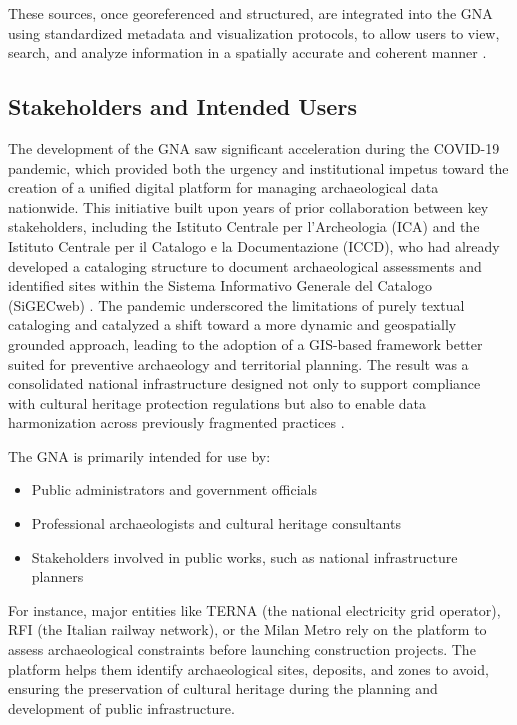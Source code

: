 \begin{spacing}{1.5}
\noindent These sources, once georeferenced and structured, are integrated into the GNA using standardized metadata and visualization protocols, to allow users to view, search, and analyze information in a spatially accurate and coherent manner \citep{boi_il_2023, acconcia_pubblicazione_2023}.

\subsection{Stakeholders and Intended Users}
The development of the GNA saw significant acceleration during the COVID-19 pandemic, which provided both the urgency and institutional impetus toward the creation of a unified digital platform for managing archaeological data nationwide. This initiative built upon years of prior collaboration between key stakeholders, including the Istituto Centrale per l’Archeologia (ICA) and the Istituto Centrale per il Catalogo e la Documentazione (ICCD), who had already developed a cataloging structure to document archaeological assessments and identified sites within the Sistema Informativo Generale del Catalogo (SiGECweb) \citep{calandra_il_2023, boi_il_2023}. The pandemic underscored the limitations of purely textual cataloging and catalyzed a shift toward a more dynamic and geospatially grounded approach, leading to the adoption of a GIS-based framework better suited for preventive archaeology and territorial planning. The result was a consolidated national infrastructure designed not only to support compliance with cultural heritage protection regulations but also to enable data harmonization across previously fragmented practices \citep{acconcia_pubblicazione_2023}.

The GNA is primarily intended for use by:
\begin{itemize}
    \item Public administrators and government officials
    \item Professional archaeologists and cultural heritage consultants
    \item Stakeholders involved in public works, such as national infrastructure planners
\end{itemize}

\noindent For instance, major entities like TERNA (the national electricity grid operator), RFI (the Italian railway network), or the Milan Metro rely on the platform to assess archaeological constraints before launching construction projects. The platform helps them identify archaeological sites, deposits, and zones to avoid, ensuring the preservation of cultural heritage during the planning and development of public infrastructure. 


\end{spacing}
